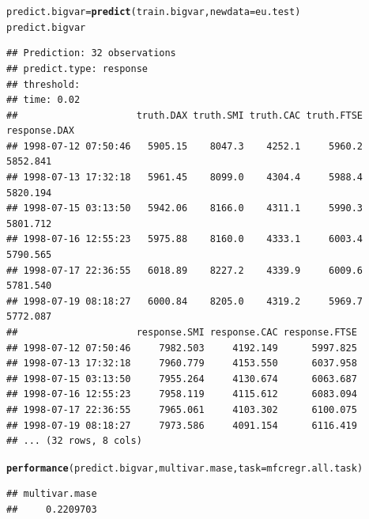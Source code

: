 \documentclass[12pt]{article}\usepackage[]{graphicx}\usepackage[]{color}
\makeatletter
\newcommand{\hlstd}[1]{\textcolor[rgb]{0.345,0.345,0.345}{#1}}%
\newcommand{\hlkwb}[1]{\textcolor[rgb]{0.69,0.353,0.396}{#1}}%
\newcommand{\hlkwc}[1]{\textcolor[rgb]{0.333,0.667,0.333}{#1}}%
\newcommand{\hlkwd}[1]{\textcolor[rgb]{0.737,0.353,0.396}{\textbf{#1}}}%
\newenvironment{kframe}{%
 \def\at@end@of@kframe{}%
 \ifinner\ifhmode%
  \def\at@end@of@kframe{\end{minipage}}%
  \begin{minipage}{\columnwidth}%
 \fi\fi%
 \def\FrameCommand##1{\hskip\@totalleftmargin \hskip-\fboxsep
 \colorbox{shadecolor}{##1}\hskip-\fboxsep
     \hskip-\linewidth \hskip-\@totalleftmargin \hskip\columnwidth}%
 \MakeFramed {\advance\hsize-\width
   \@totalleftmargin\z@ \linewidth\hsize
   \@setminipage}}%
 {\par\unskip\endMakeFramed%
 \at@end@of@kframe}
\newenvironment{knitrout}{}{} %
\theoremstyle{definition}
\makeatother
\begin{document}
\singlespacing
\begin{knitrout}
\color{fgcolor}\begin{kframe}
\begin{alltt}
\hlstd{predict.bigvar} \hlkwb{=} \hlkwd{predict}\hlstd{(train.bigvar,} \hlkwc{newdata} \hlstd{= eu.test)}
\hlstd{predict.bigvar}
\end{alltt}
\begin{verbatim}
## Prediction: 32 observations
## predict.type: response
## threshold: 
## time: 0.02
##                     truth.DAX truth.SMI truth.CAC truth.FTSE response.DAX
## 1998-07-12 07:50:46   5905.15    8047.3    4252.1     5960.2     5852.841
## 1998-07-13 17:32:18   5961.45    8099.0    4304.4     5988.4     5820.194
## 1998-07-15 03:13:50   5942.06    8166.0    4311.1     5990.3     5801.712
## 1998-07-16 12:55:23   5975.88    8160.0    4333.1     6003.4     5790.565
## 1998-07-17 22:36:55   6018.89    8227.2    4339.9     6009.6     5781.540
## 1998-07-19 08:18:27   6000.84    8205.0    4319.2     5969.7     5772.087
##                     response.SMI response.CAC response.FTSE
## 1998-07-12 07:50:46     7982.503     4192.149      5997.825
## 1998-07-13 17:32:18     7960.779     4153.550      6037.958
## 1998-07-15 03:13:50     7955.264     4130.674      6063.687
## 1998-07-16 12:55:23     7958.119     4115.612      6083.094
## 1998-07-17 22:36:55     7965.061     4103.302      6100.075
## 1998-07-19 08:18:27     7973.586     4091.154      6116.419
## ... (32 rows, 8 cols)
\end{verbatim}
\begin{alltt}
\hlkwd{performance}\hlstd{(predict.bigvar, multivar.mase,} \hlkwc{task} \hlstd{= mfcregr.all.task)}
\end{alltt}
\begin{verbatim}
## multivar.mase 
##     0.2209703
\end{verbatim}
\end{kframe}
\end{knitrout}
\end{document}
